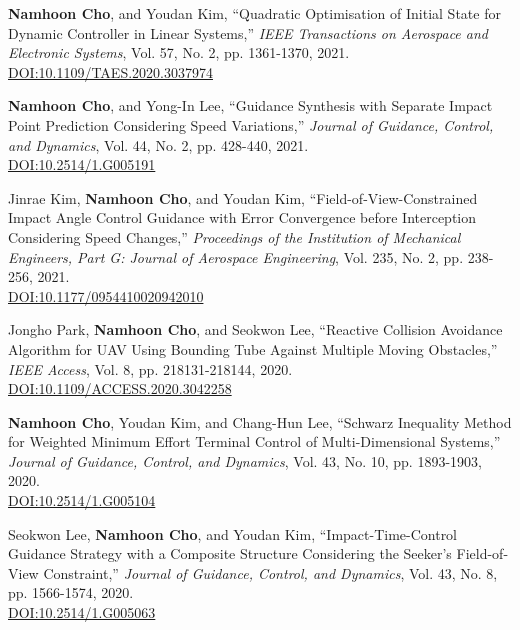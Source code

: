 \begin{enumerate}[itemsep=0.5em, label={[}J\arabic*{]}]
\item \textbf{Namhoon Cho}, and Youdan Kim, ``Quadratic Optimisation of Initial State for Dynamic Controller in Linear Systems,'' \textit{IEEE Transactions on Aerospace and Electronic Systems}, Vol. 57, No. 2, pp. 1361-1370, 2021. \\
\href{https://doi.org/10.1109/TAES.2020.3037974}{DOI:10.1109/TAES.2020.3037974}

\item \textbf{Namhoon Cho}, and Yong-In Lee, ``Guidance Synthesis with Separate Impact Point Prediction Considering Speed Variations,'' \textit{Journal of Guidance, Control, and Dynamics}, Vol. 44, No. 2, pp. 428-440, 2021. \\
\href{https://doi.org/10.2514/1.G005191}{DOI:10.2514/1.G005191}

\item Jinrae Kim, \textbf{Namhoon Cho}, and Youdan Kim, ``Field-of-View-Constrained Impact Angle Control Guidance with Error Convergence before Interception Considering Speed Changes,'' \textit{Proceedings of the Institution of Mechanical Engineers, Part G: Journal of Aerospace Engineering}, Vol. 235, No. 2, pp. 238-256, 2021. \\
\href{https://doi.org/10.1177/0954410020942010}{DOI:10.1177/0954410020942010}

\item Jongho Park, \textbf{Namhoon Cho}, and Seokwon Lee, ``Reactive Collision Avoidance Algorithm for UAV Using Bounding Tube Against Multiple Moving Obstacles,'' \textit{IEEE Access}, Vol. 8, pp. 218131-218144, 2020. \\
\href{https://doi.org/10.1109/ACCESS.2020.3042258}{DOI:10.1109/ACCESS.2020.3042258}

\item \textbf{Namhoon Cho}, Youdan Kim, and Chang-Hun Lee, ``Schwarz Inequality Method for Weighted Minimum Effort Terminal Control of Multi-Dimensional Systems,'' \textit{Journal of Guidance, Control, and Dynamics}, Vol. 43, No. 10, pp. 1893-1903, 2020. \\
\href{https://doi.org/10.2514/1.G005104}{DOI:10.2514/1.G005104}

\item Seokwon Lee, \textbf{Namhoon Cho}, and Youdan Kim, ``Impact-Time-Control Guidance Strategy with a Composite Structure Considering the Seeker's Field-of-View Constraint,'' \textit{Journal of Guidance, Control, and Dynamics}, Vol. 43, No. 8, pp. 1566-1574, 2020. \\
\href{https://doi.org/10.2514/1.G005063}{DOI:10.2514/1.G005063}


\end{enumerate}
